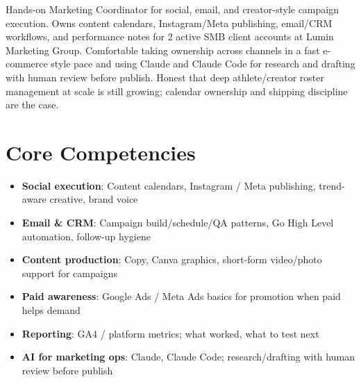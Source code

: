 \documentclass[11pt,a4paper,sans]{moderncv}
\begin{document}
\makecvtitle

\vspace{6pt}
\small{Hands-on Marketing Coordinator for social, email, and creator-style campaign execution. Owns content calendars, Instagram/Meta publishing, email/CRM workflows, and performance notes for 2 active SMB client accounts at Lumin Marketing Group. Comfortable taking ownership across channels in a fast e-commerce style pace and using Claude and Claude Code for research and drafting with human review before publish. Honest that deep athlete/creator roster management at scale is still growing; calendar ownership and shipping discipline are the case.}

\section{Core Competencies}
\vspace{1pt}
\begin{itemize}
\item \textbf{Social execution}: Content calendars, Instagram / Meta publishing, trend-aware creative, brand voice
\item \textbf{Email \& CRM}: Campaign build/schedule/QA patterns, Go High Level automation, follow-up hygiene
\item \textbf{Content production}: Copy, Canva graphics, short-form video/photo support for campaigns
\item \textbf{Paid awareness}: Google Ads / Meta Ads basics for promotion when paid helps demand
\item \textbf{Reporting}: GA4 / platform metrics; what worked, what to test next
\item \textbf{AI for marketing ops}: Claude, Claude Code; research/drafting with human review before publish
\end{itemize}
\end{document}
